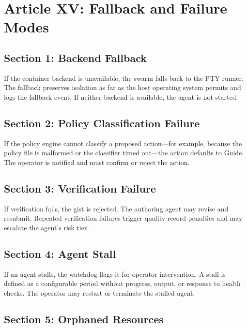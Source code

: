 \documentclass[12pt,letterpaper]{article}
\begin{document}
\section{Article XV: Fallback and Failure Modes}
\label{art:fallbacks}

\subsection{Section 1: Backend Fallback}

If the container backend is unavailable, the swarm falls back to the PTY runner. The fallback preserves isolation as far as the host operating system permits and logs the fallback event. If neither backend is available, the agent is not started.

\subsection{Section 2: Policy Classification Failure}

If the policy engine cannot classify a proposed action---for example, because the policy file is malformed or the classifier timed out---the action defaults to Guide. The operator is notified and must confirm or reject the action.

\subsection{Section 3: Verification Failure}

If verification fails, the gist is rejected. The authoring agent may revise and resubmit. Repeated verification failures trigger quality-record penalties and may escalate the agent's risk tier.

\subsection{Section 4: Agent Stall}

If an agent stalls, the watchdog flags it for operator intervention. A stall is defined as a configurable period without progress, output, or response to health checks. The operator may restart or terminate the stalled agent.

\subsection{Section 5: Orphaned Resources}
\end{document}
